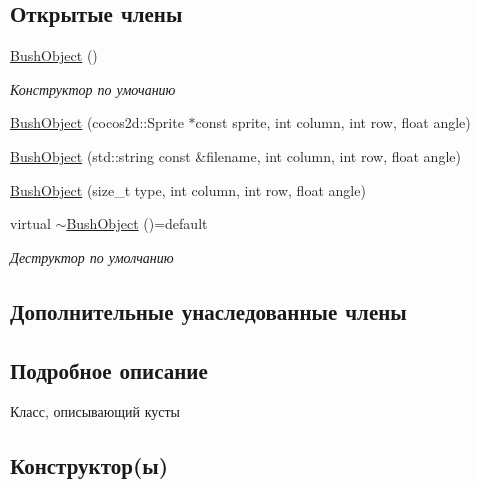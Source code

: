 \subsection*{Открытые члены}
\begin{DoxyCompactItemize}
\item 
\mbox{\label{classrtm_1_1_bush_object_af4d581df3386bb72e85431d52d6bc271}} 
\hyperlink{classrtm_1_1_bush_object_af4d581df3386bb72e85431d52d6bc271}{Bush\+Object} ()
\begin{DoxyCompactList}\small\item\em Конструктор по умочанию \end{DoxyCompactList}\item 
\hyperlink{classrtm_1_1_bush_object_a917899e0677ca029936536e389b2a947}{Bush\+Object} (cocos2d\+::\+Sprite $\ast$const sprite, int column, int row, float angle)
\item 
\hyperlink{classrtm_1_1_bush_object_ad0ba65e5d0023bc7b152690186fe96d8}{Bush\+Object} (std\+::string const \&filename, int column, int row, float angle)
\item 
\hyperlink{classrtm_1_1_bush_object_a3d5c2f590082af7c0238bdf84bcaa4b2}{Bush\+Object} (size\+\_\+t type, int column, int row, float angle)
\item 
\mbox{\label{classrtm_1_1_bush_object_ad0bdc84786e3b91fbe2fdf50487e6e9a}} 
virtual \hyperlink{classrtm_1_1_bush_object_ad0bdc84786e3b91fbe2fdf50487e6e9a}{$\sim$\+Bush\+Object} ()=default
\begin{DoxyCompactList}\small\item\em Деструктор по умолчанию \end{DoxyCompactList}\end{DoxyCompactItemize}
\subsection*{Дополнительные унаследованные члены}


\subsection{Подробное описание}
Класс, описывающий кусты 

\subsection{Конструктор(ы)}
\mbox{\label{classrtm_1_1_bush_object_a917899e0677ca029936536e389b2a947}} 
